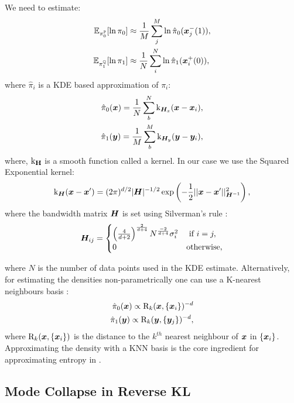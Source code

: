 \documentclass[a4paper,12pt,twoside,openright]{report}
\theoremstyle{definition}
\begin{document}
We need to estimate:
\begin{align*}
\mathbb{E}_{\pi_0^{\mathbb{P}}}[\ln\pi_{0}] &\approx \frac{1}{M}\sum_{j}^{M} \ln \hat{\pi}_0({\bm{x}}_j^{-}(1)), \\
\mathbb{E}_{\pi_1^{\mathbb{Q}}}[\ln\pi_{1}] &\approx \frac{1}{N}\sum_{i}^{N} \ln \hat{\pi}_1({\bm{x}}_i^{+}(0)),
\end{align*}
where $\hat{\pi}_i$ is a KDE based approximation of $\pi_i$:
\begin{align*}
\hat{\pi}_0({\bm{x}}) = \frac{1}{N} \sum_b^{N} {\text{k}}_{{\bm{H}}_x}({\bm{x}} - {\bm{x}}_i), \\
\hat{\pi}_1({\bm{y}}) = \frac{1}{M} \sum_b^{M} {\text{k}}_{{\bm{H}}_y}({\bm{y}} - {\bm{y}}_i),
\end{align*}
where, ${\text{k}}_{\textbf{H}}$ is a smooth function called a kernel. In our case we use the Squared Exponential kernel:
\begin{align*}
{\text{k}}_{{\bm{H}}}({\bm{x}}-{\bm{x}}') = (2\pi)^{d/2}|{\bm{H}}|^{-1/2}\exp\left(-\frac{1}{2}||{\bm{x}}-{\bm{x}}'||^{2}_{{\bm{H}}^{-1}}\right),
\end{align*}
where the bandwidth matrix ${\bm{H}}$ is set using Silverman's rule \citep{silverman1986density}:
\begin{align}
{\bm{H}}_{ij} = \begin{cases}
\left(\frac{4}{d+2}\right)^{\frac{2}{d+4}} N^{\frac{-2}{d+4}} \sigma_{i}^2  &\text{  if  } i=j, \\
0  &\text{otherwise},
\end{cases}
\end{align}

where $N$ is the number of data points used in the KDE estimate. Alternatively, for estimating the densities non-parametrically one can use a K-nearest neighbours basis \citep{veksler2013nonparametric}:
\begin{align*}
\hat{\pi}_0({\bm{x}}) \propto  \text{R}_k({\bm{x}}, \{{\bm{x}}_i\})^{-d}\\
\hat{\pi}_1({\bm{y}}) \propto \text{R}_k({\bm{y}}, \{{\bm{y}}_j\})^{-d},
\end{align*}
where $\text{R}_k({\bm{x}}, \{{\bm{x}}_i\})$ is the distance to the $k^{th}$ nearest neighbour of ${\bm{x}}$ in $\{{\bm{x}}_i\}$.  Approximating the density with a KNN basis is the core ingredient for approximating entropy in \cite{singh2016analysis}.

\subsection{Mode Collapse in Reverse KL}
\end{document}
